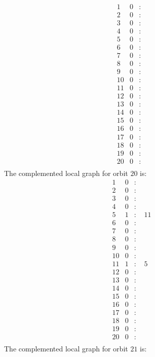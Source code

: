 \documentclass[12pt]{article}
\begin{document}
\begin{equation*}
\begin{array}{rrcl}
1&0&:&\\
2&0&:&\\
3&0&:&\\
4&0&:&\\
5&0&:&\\
6&0&:&\\
7&0&:&\\
8&0&:&\\
9&0&:&\\
10&0&:&\\
11&0&:&\\
12&0&:&\\
13&0&:&\\
14&0&:&\\
15&0&:&\\
16&0&:&\\
17&0&:&\\
18&0&:&\\
19&0&:&\\
20&0&:&\\
\end{array}
\end{equation*}
The complemented local graph for orbit $20$ is:
\begin{equation*}
\begin{array}{rrcl}
1&0&:&\\
2&0&:&\\
3&0&:&\\
4&0&:&\\
5&1&:&\,\,11\\
6&0&:&\\
7&0&:&\\
8&0&:&\\
9&0&:&\\
10&0&:&\\
11&1&:&\,\,5\\
12&0&:&\\
13&0&:&\\
14&0&:&\\
15&0&:&\\
16&0&:&\\
17&0&:&\\
18&0&:&\\
19&0&:&\\
20&0&:&\\
\end{array}
\end{equation*}
The complemented local graph for orbit $21$ is:
\end{document}

